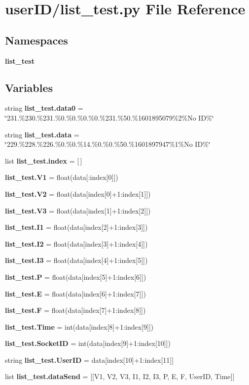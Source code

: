 \section{user\+I\+D/list\+\_\+test.py File Reference}
\label{list__test_8py}
\subsection*{Namespaces}
\begin{DoxyCompactItemize}
\item 
 \textbf{ list\+\_\+test}
\end{DoxyCompactItemize}
\subsection*{Variables}
\begin{DoxyCompactItemize}
\item 
string \textbf{ list\+\_\+test.\+data0} = \char`\"{}231.\%230.\%231.\%0.\%0.\%0.\%0.\%231.\%50.\%1601895079\%2\%No ID\%\char`\"{}
\item 
string \textbf{ list\+\_\+test.\+data} = \char`\"{}229.\%228.\%226.\%0.\%0.\%14.\%0.\%0.\%50.\%1601897947\%1\%No ID\%\char`\"{}
\item 
list \textbf{ list\+\_\+test.\+index} = [$\,$]
\item 
\textbf{ list\+\_\+test.\+V1} = float(data[\+:index[0]])
\item 
\textbf{ list\+\_\+test.\+V2} = float(data[index[0]+1\+:index[1]])
\item 
\textbf{ list\+\_\+test.\+V3} = float(data[index[1]+1\+:index[2]])
\item 
\textbf{ list\+\_\+test.\+I1} = float(data[index[2]+1\+:index[3]])
\item 
\textbf{ list\+\_\+test.\+I2} = float(data[index[3]+1\+:index[4]])
\item 
\textbf{ list\+\_\+test.\+I3} = float(data[index[4]+1\+:index[5]])
\item 
\textbf{ list\+\_\+test.\+P} = float(data[index[5]+1\+:index[6]])
\item 
\textbf{ list\+\_\+test.\+E} = float(data[index[6]+1\+:index[7]])
\item 
\textbf{ list\+\_\+test.\+F} = float(data[index[7]+1\+:index[8]])
\item 
\textbf{ list\+\_\+test.\+Time} = int(data[index[8]+1\+:index[9]])
\item 
\textbf{ list\+\_\+test.\+Socket\+ID} = int(data[index[9]+1\+:index[10]])
\item 
string \textbf{ list\+\_\+test.\+User\+ID} = data[index[10]+1\+:index[11]]
\item 
list \textbf{ list\+\_\+test.\+data\+Send} = [[V1, V2, V3, I1, I2, I3, P, E, F, User\+ID, Time]]
\end{DoxyCompactItemize}
